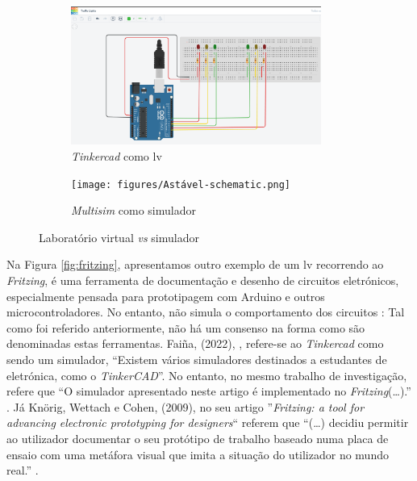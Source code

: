\begin{figure}[hbtp]
    \centering
    \begin{subfigure}[hbtp]{0.48\textwidth}
        \centering
        \includegraphics[width=0.9\textwidth]{figures/tinkercad_exemplo.png}
        \caption{\textit{Tinkercad} como \acrshort{lv}}
        \label{fig:tinkercadVL}
    \end{subfigure}
    \begin{subfigure}[hbtp]{0.48\textwidth}
        \texttt{[image: figures/Astável-schematic.png]}
        \caption{\textit{Multisim} como simulador}
        \label{fig:multisimSimulador}
    \end{subfigure}
    \caption{Laboratório virtual \textit{vs} simulador}
    \label{fig:tinkercad}
\end{figure}

Na Figura \ref{fig:fritzing}, apresentamos outro exemplo de um \acrshort{lv} recorrendo ao \textit{Fritzing}, é uma ferramenta de documentação e desenho de circuitos eletrónicos, especialmente pensada para prototipagem com Arduino e outros microcontroladores. No entanto, não simula o comportamento dos circuitos : Tal como foi referido anteriormente, não há um consenso na forma como são denominadas estas ferramentas. Faiña, (2022), \cite{faina}, refere-se ao \textit{Tinkercad} como sendo um simulador, ``Existem vários simuladores destinados a estudantes de eletrónica, como o \textit{TinkerCAD}''. No entanto, no mesmo trabalho de investigação, refere que ``O simulador apresentado neste artigo é implementado no \textit{Fritzing}(\ldots).'' \cite{faina}. Já Knörig, Wettach e Cohen, (2009), no seu artigo ''\textit{Fritzing: a tool for advancing electronic prototyping for designers}`` referem que ``(\ldots) decidiu permitir ao utilizador documentar o seu protótipo de trabalho baseado numa placa de ensaio com uma metáfora visual que imita a situação do utilizador no mundo real.'' \cite{Knorig2009Feb}.

